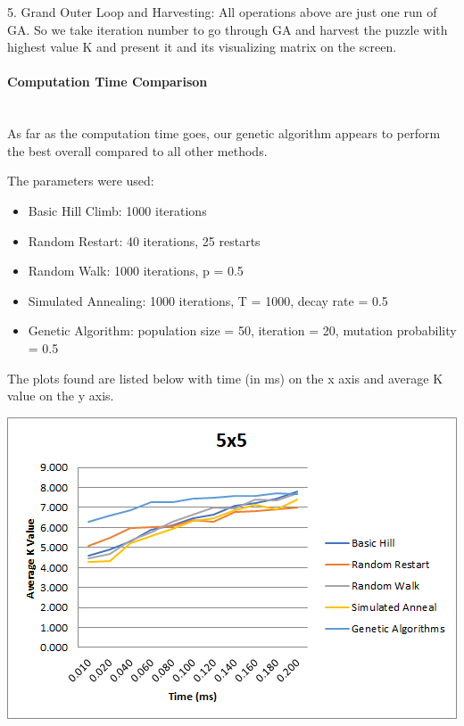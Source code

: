 \documentclass[12pt, letterpaper]{article}
\begin{document}
5. Grand Outer Loop and Harvesting: All operations above are just one run of GA. So we take iteration number to go through GA and harvest the puzzle with highest value K and present it and its visualizing matrix on the screen.\\

\bigskip
\paragraph{Computation Time Comparison} \mbox{}\\

As far as the computation time goes, our genetic algorithm appears to perform the best overall compared to all other methods. 

The parameters were used:

\begin{itemize}
	\item Basic Hill Climb: 1000 iterations
	\item Random Restart: 40 iterations, 25 restarts
	\item Random Walk: 1000 iterations, p = 0.5
	\item Simulated Annealing: 1000 iterations, T = 1000, decay rate = 0.5
	\item Genetic Algorithm: population size = 50, iteration = 20, mutation probability = 0.5
\end{itemize}

The plots found are listed below with time (in ms) on the x axis and average K value on the y axis.

\includegraphics[width=\linewidth]{"Task 7/5x5 Timeplot"}

\bigskip
\end{document}
